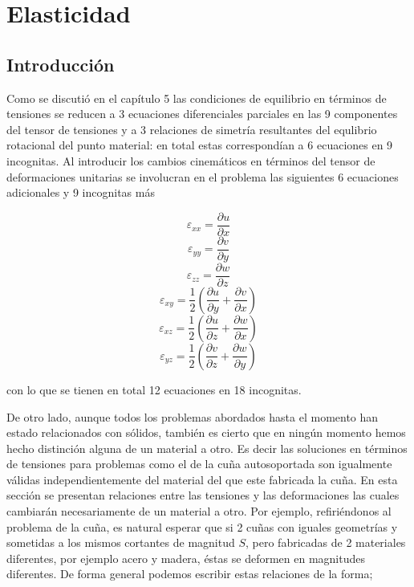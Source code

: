 \documentclass[../notas medios.tex]{subfiles}
\begin{document}
\chapter{Elasticidad}

\graphicspath{{IMAGES/Cap6/}} 								 %
\section{Introducción}
Como se discutió en el capítulo 5 las condiciones de equilibrio en términos de tensiones se reducen a 3 ecuaciones diferenciales parciales en las 9 componentes del tensor de tensiones y a 3 relaciones de simetría resultantes del equlibrio rotacional del punto material: en total estas correspondían a 6 ecuaciones en 9 incognitas. Al introducir los cambios cinemáticos en términos del tensor de deformaciones unitarias se involucran en el problema las siguientes 6 ecuaciones adicionales y 9 incognitas más


\[{\varepsilon _{xx}} = \frac{{\partial u}}{{\partial x}}\]
\[{\varepsilon _{yy}} = \frac{{\partial v}}{{\partial y}}\]
\[{\varepsilon _{zz}} = \frac{{\partial w}}{{\partial z}}\]
\[{\varepsilon _{xy}} = \frac{1}{2}\left( {\frac{{\partial u}}{{\partial y}} + \frac{{\partial v}}{{\partial x}}} \right)\]
\[{\varepsilon _{xz}} = \frac{1}{2}\left( {\frac{{\partial u}}{{\partial z}} + \frac{{\partial w}}{{\partial x}}} \right)\]
\[{\varepsilon _{yz}} = \frac{1}{2}\left( {\frac{{\partial v}}{{\partial z}} + \frac{{\partial w}}{{\partial y}}} \right)\]

con lo que se tienen en total 12 ecuaciones en 18 incognitas.

De otro lado, aunque todos los problemas abordados hasta el momento han estado relacionados con sólidos, también es cierto que en ningún momento hemos hecho distinción alguna de un material a otro. Es decir las soluciones en términos de tensiones para problemas como el de la cuña autosoportada son igualmente válidas independientemente del material del que este fabricada la cuña. En esta sección se presentan  relaciones entre las tensiones y las deformaciones las cuales cambiarán necesariamente de un material a otro. Por ejemplo, refiriéndonos al problema de la cuña, es natural esperar que si 2 cuñas con iguales geometrías y sometidas a los mismos cortantes de magnitud $S$, pero fabricadas de 2 materiales diferentes, por ejemplo acero y madera, éstas se deformen en magnitudes diferentes. De forma general podemos escribir estas relaciones de la forma;
\end{document}
